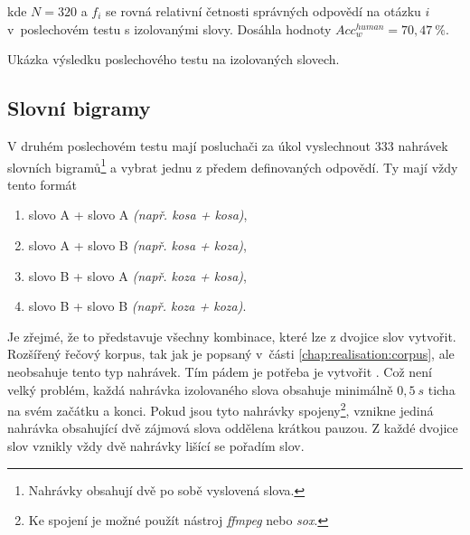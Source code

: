 \noindent kde $N=320$ a $f_i$ se rovná relativní četnosti správných odpovědí na otázku $i$ v~poslechovém testu s izolovanými slovy. Dosáhla hodnoty $Acc_w^{human} = 70,47\ \%$.

\begin{table}[htpb]
  \centering
  \def\arraystretch{1.5}
  \caption{Ukázka výsledku poslechového testu na izolovaných slovech.}
  \label{tab:realisation:listening:isolated}
\end{table}

\subsection{Slovní bigramy}
\label{chap:realisation:listening:bigrams}

V druhém poslechovém testu mají posluchači za úkol vyslechnout $333$ nahrávek slovních bigramů\footnote{Nahrávky obsahují dvě po sobě vyslovená slova.} a vybrat jednu z předem definovaných odpovědí. Ty mají vždy tento formát

\begin{enumerate}[label=\alph*)]
  \item slovo A + slovo A \textit{(např. kosa + kosa)},
  \item slovo A + slovo B \textit{(např. kosa + koza)},
  \item slovo B + slovo A \textit{(např. koza + kosa)},
  \item slovo B + slovo B \textit{(např. koza + koza)}.
\end{enumerate}

\noindent Je zřejmé, že to představuje všechny kombinace, které lze z dvojice slov vytvořit. Rozšířený řečový korpus, tak jak je popsaný v~části \ref{chap:realisation:corpus}, ale neobsahuje tento typ nahrávek. Tím pádem je potřeba je vytvořit . Což není velký problém, každá nahrávka izolovaného slova obsahuje minimálně $0,5\ s$ ticha na svém začátku a konci. Pokud jsou tyto nahrávky spojeny\footnote{Ke spojení je možné použít nástroj \textit{ffmpeg} nebo \textit{sox}.}, vznikne jediná nahrávka obsahující dvě zájmová slova oddělena krátkou pauzou. Z každé dvojice slov vznikly vždy dvě nahrávky lišící se pořadím slov.

